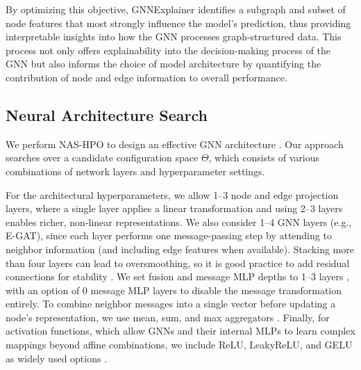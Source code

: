 \documentclass[journal]{IEEEtran}
\begin{document}
By optimizing this objective, GNNExplainer identifies a subgraph and subset of node features that most strongly influence the model's prediction, thus providing interpretable insights into how the GNN processes graph-structured data. This process not only offers explainability into the decision-making process of the GNN but also informs the choice of model architecture by quantifying the contribution of node and edge information to overall performance.




\subsection{Neural Architecture Search} \label{sec:nas_subsec}

We perform NAS-HPO to design an effective GNN architecture \cite{izquierdo2021bag}. Our approach searches over a candidate configuration space $\Theta$, which consists of various combinations of network layers and hyperparameter settings. 

For the architectural hyperparameters, we allow 1–3 node and edge projection layers, where a single layer applies a linear transformation and using 2–3 layers enables richer, non‐linear representations. We also consider 1–4 GNN layers (e.g., E-GAT), since each layer performs one message-passing step by attending to neighbor information (and including edge features when available). Stacking more than four layers can lead to oversmoothing, so it is good practice to add residual connections for stability \cite{lell2023split}. We set fusion and message MLP depths to 1–3 layers \cite{stark20223d}, with an option of 0 message MLP layers to disable the message transformation entirely. To combine neighbor messages into a single vector before updating a node’s representation, we use mean, sum, and max aggregators \cite{you2020design}. Finally, for activation functions, which allow GNNs and their internal MLPs to learn complex mappings beyond affine combinations, we include ReLU, LeakyReLU, and GELU as widely used options \cite{rasool2024optimizing}.
\end{document}
